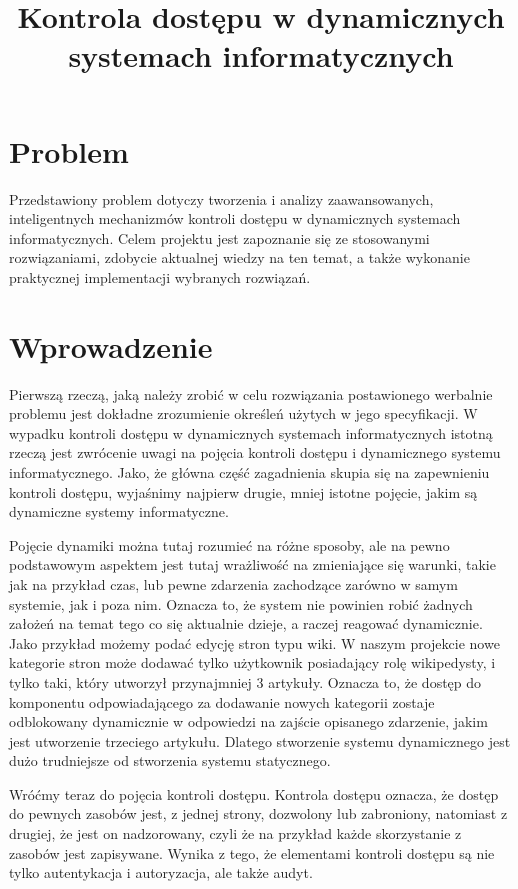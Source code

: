 \documentclass{classrep}
\author{%
  \studentinfo{Mateusz Grotek}{186816} \and
  \studentinfo{Mateusz Jakóbczak}{186819} \and
  \studentinfo{Rafał Jurkiewicz}{186822} \and
  \studentinfo{Łukasz Kotyński}{186829} \and
  \studentinfo{Paweł Tarasiuk}{186875}
}
\title{Kontrola dostępu w dynamicznych systemach informatycznych}
\begin{document}
\maketitle

\section{Problem}
Przedstawiony problem dotyczy tworzenia i analizy zaawansowanych, inteligentnych mechanizmów kontroli dostępu w dynamicznych systemach informatycznych. Celem projektu jest
zapoznanie się ze stosowanymi rozwiązaniami, zdobycie aktualnej wiedzy na ten temat, a także wykonanie praktycznej implementacji wybranych rozwiązań.
\section{Wprowadzenie}
Pierwszą rzeczą, jaką należy zrobić w celu rozwiązania postawionego werbalnie problemu jest dokładne zrozumienie określeń użytych w jego specyfikacji. W wypadku
kontroli dostępu w dynamicznych systemach informatycznych istotną rzeczą jest zwrócenie uwagi na pojęcia kontroli dostępu i dynamicznego systemu informatycznego. Jako, że główna
część zagadnienia skupia się na zapewnieniu kontroli dostępu, wyjaśnimy najpierw drugie, mniej istotne pojęcie, jakim są dynamiczne systemy informatyczne.

Pojęcie dynamiki można tutaj
rozumieć na różne sposoby, ale na pewno podstawowym aspektem jest tutaj wrażliwość na zmieniające się warunki, takie jak na przykład czas, lub pewne zdarzenia zachodzące zarówno 
w samym systemie, jak i poza nim. Oznacza to, że system nie powinien robić żadnych założeń na temat tego co się aktualnie dzieje, a raczej reagować dynamicznie. 
Jako przykład możemy podać edycję stron typu wiki. W naszym projekcie nowe kategorie stron może dodawać tylko użytkownik posiadający rolę wikipedysty, i tylko taki, który utworzył
przynajmniej 3 artykuły. Oznacza to, że dostęp do komponentu odpowiadającego za dodawanie nowych kategorii zostaje odblokowany dynamicznie w odpowiedzi na zajście
opisanego zdarzenie, jakim jest utworzenie trzeciego artykułu.
Dlatego stworzenie systemu dynamicznego jest dużo trudniejsze od stworzenia systemu statycznego.

Wróćmy teraz do pojęcia kontroli dostępu. Kontrola dostępu oznacza, że dostęp do pewnych zasobów jest, z jednej strony, dozwolony lub zabroniony, natomiast z drugiej, że
jest on nadzorowany, czyli że na przykład każde skorzystanie z zasobów jest zapisywane. Wynika z tego, że elementami kontroli
dostępu są nie tylko autentykacja i autoryzacja, ale także audyt.
\end{document}
